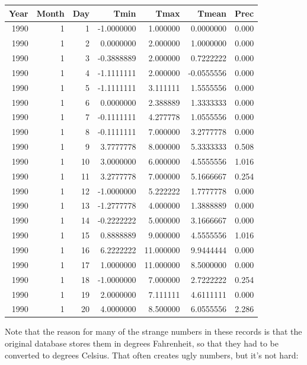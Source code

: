 \documentclass[
]{book}
\begin{document}
\begin{tabular}{r|r|r|r|r|r|r}
\hline
Year & Month & Day & Tmin & Tmax & Tmean & Prec\\
\hline
1990 & 1 & 1 & -1.0000000 & 1.000000 & 0.0000000 & 0.000\\
\hline
1990 & 1 & 2 & 0.0000000 & 2.000000 & 1.0000000 & 0.000\\
\hline
1990 & 1 & 3 & -0.3888889 & 2.000000 & 0.7222222 & 0.000\\
\hline
1990 & 1 & 4 & -1.1111111 & 2.000000 & -0.0555556 & 0.000\\
\hline
1990 & 1 & 5 & -1.1111111 & 3.111111 & 1.5555556 & 0.000\\
\hline
1990 & 1 & 6 & 0.0000000 & 2.388889 & 1.3333333 & 0.000\\
\hline
1990 & 1 & 7 & -0.1111111 & 4.277778 & 1.0555556 & 0.000\\
\hline
1990 & 1 & 8 & -0.1111111 & 7.000000 & 3.2777778 & 0.000\\
\hline
1990 & 1 & 9 & 3.7777778 & 8.000000 & 5.3333333 & 0.508\\
\hline
1990 & 1 & 10 & 3.0000000 & 6.000000 & 4.5555556 & 1.016\\
\hline
1990 & 1 & 11 & 3.2777778 & 7.000000 & 5.1666667 & 0.254\\
\hline
1990 & 1 & 12 & -1.0000000 & 5.222222 & 1.7777778 & 0.000\\
\hline
1990 & 1 & 13 & -1.2777778 & 4.000000 & 1.3888889 & 0.000\\
\hline
1990 & 1 & 14 & -0.2222222 & 5.000000 & 3.1666667 & 0.000\\
\hline
1990 & 1 & 15 & 0.8888889 & 9.000000 & 4.5555556 & 1.016\\
\hline
1990 & 1 & 16 & 6.2222222 & 11.000000 & 9.9444444 & 0.000\\
\hline
1990 & 1 & 17 & 1.0000000 & 11.000000 & 8.5000000 & 0.000\\
\hline
1990 & 1 & 18 & -1.0000000 & 7.000000 & 2.7222222 & 0.254\\
\hline
1990 & 1 & 19 & 2.0000000 & 7.111111 & 4.6111111 & 0.000\\
\hline
1990 & 1 & 20 & 4.0000000 & 8.500000 & 6.0555556 & 2.286\\
\hline
\end{tabular}
\endgroup{}

Note that the reason for many of the strange numbers in these records is that the original database stores them in degrees Fahrenheit, so that they had to be converted to degrees Celsius. That often creates ugly numbers, but it's not hard:
\end{document}
